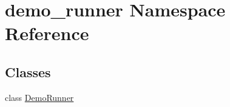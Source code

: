 \hypertarget{namespacedemo__runner}{}\section{demo\+\_\+runner Namespace Reference}
\label{namespacedemo__runner}
\subsection*{Classes}
\begin{DoxyCompactItemize}
\item 
class \hyperlink{classdemo__runner_1_1_demo_runner}{Demo\+Runner}
\end{DoxyCompactItemize}

